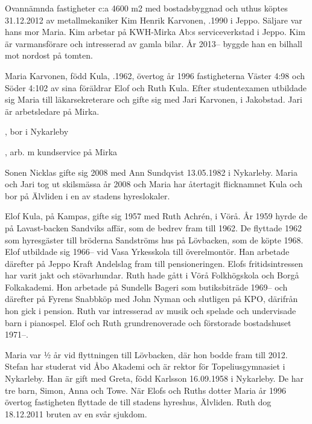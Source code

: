 


Ovannämnda fastigheter c:a 4600 m2 med bostadsbyggnad och uthus köptes 31.12.2012 av metallmekaniker Kim Henrik Karvonen, .1990 i Jeppo. Säljare var hans mor Maria. Kim arbetar på KWH-Mirka Ab:s serviceverkstad i Jeppo. Kim är varmansförare och intresserad av gamla bilar. År 2013-- byggde han en bilhall mot nordost på tomten.


Maria Karvonen, född Kula, .1962, övertog år 1996 fastigheterna	Väster 4:98 och Söder 4:102 av sina föräldrar Elof och Ruth Kula. Efter studentexamen utbildade sig Maria till läkarsekreterare och gifte sig med Jari Karvonen,  i Jakobstad. Jari är arbetsledare på Mirka.
\begin{jhchildren}
  \item {}, bor i Nykarleby
  \item {}
  \item {}, arb. m kundservice på Mirka
\end{jhchildren}
Sonen Nicklas gifte sig 2008 med Ann Sundqvist 13.05.1982 i Nykarleby. Maria och Jari tog ut skilsmässa år 2008 och Maria har återtagit flicknamnet Kula och bor på Älvliden i en av stadens hyreslokaler.


Elof Kula,  på Kampas, gifte sig 1957 med Ruth Achrén,  i Vörå.  År 1959 hyrde de på Lavast-backen Sandviks affär, som de bedrev fram till 1962. De flyttade 1962 som hyresgäster till bröderna Sandströms hus på Lövbacken, som de köpte 1968. Elof utbildade sig 1966-- vid Vasa Yrkesskola till överelmontör. Han arbetade därefter på Jeppo Kraft Andelslag fram till pensioneringen. Elofs fritidsintressen har varit jakt och stövarhundar. Ruth hade gått i Vörå Folkhögskola och Borgå Folkakademi. Hon arbetade på Sundells Bageri som butiksbiträde 1969-- och därefter på Fyrens Snabbköp med John Nyman och slutligen på KPO, därifrån hon gick i pension. Ruth var intresserad av musik och spelade och undervisade barn i pianospel. Elof och Ruth grundrenoverade och förstorade bostadshuset 1971--.
\begin{jhchildren}
  \item {}
  \item {}
\end{jhchildren}
Maria var ½ år vid flyttningen till Lövbacken, där hon bodde fram till 2012. Stefan har studerat vid Åbo Akademi och är rektor för Topeliusgymnasiet i Nykarleby. Han är gift med Greta, född Karlsson 16.09.1958 i Nykarleby. De har tre barn, Simon, Anna och Towe.	När Elofs och Ruths dotter Maria år 1996 övertog fastigheten flyttade de till stadens hyreshus,  Älvliden.  Ruth dog 18.12.2011 bruten av en svår sjukdom.


